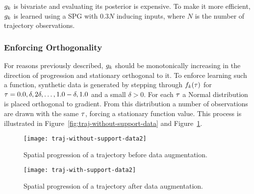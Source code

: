 $g_{k}$ is bivariate and evaluating its posterior is expensive. To make
it more efficient, $g_{k}$ is learned using a SPG with $0.3N$ inducing inputs, 
where $N$ is the number of trajectory observations.

\subsubsection{Enforcing Orthogonality}\label{sec:data-augmentation}
For reasons previously described, $g_{k}$ should be monotonically increasing in
the direction of progression and stationary orthogonal to it.
To enforce learning such a function, synthetic data is generated by 
stepping through $f_{k}(\tau)$ for $\tau = 0.0,
\delta, 2\delta, \dots, 1.0-\delta, 1.0$ and a small $\delta > 0$. For each
$\tau$ a Normal distribution is placed orthogonal to
gradient. From this distribution a number of observations are drawn with the same 
$\tau$, forcing a stationary function value. This process is illustrated in
Figure~\ref{fig:traj-without-support-data} and
Figure~\ref{fig:traj-with-support-data}. 
\begin{figure}
  \begin{minipage}{.46\textwidth}
    \texttt{[image: traj-without-support-data2]}
    \caption{Spatial progression of a trajectory
      before data augmentation.}\label{fig:traj-without-support-data}
  \end{minipage}
  \hspace{5pt}
  \begin{minipage}{.46\textwidth}
    \texttt{[image: traj-with-support-data2]}
    \caption{Spatial progression of a trajectory
      after data augmentation. }\label{fig:traj-with-support-data}
  \end{minipage}
\end{figure}

